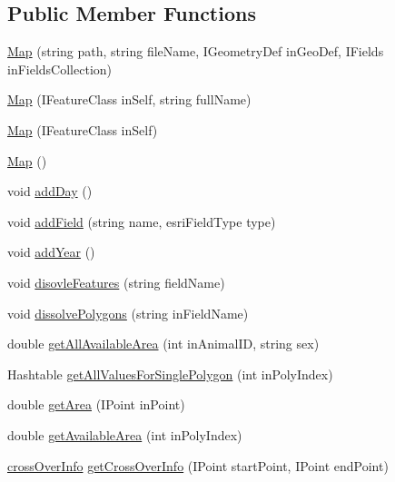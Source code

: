 \subsection*{Public Member Functions}
\begin{DoxyCompactItemize}
\item 
\hyperlink{class_s_e_a_r_c_h_1_1_map_a7ecbb3dd1eac1ee71904194f9ca07d9b}{Map} (string path, string file\-Name, I\-Geometry\-Def in\-Geo\-Def, I\-Fields in\-Fields\-Collection)
\item 
\hyperlink{class_s_e_a_r_c_h_1_1_map_a953088c1888b52aeb6e5e3ac07c727d5}{Map} (I\-Feature\-Class in\-Self, string full\-Name)
\item 
\hyperlink{class_s_e_a_r_c_h_1_1_map_af383f58d5e3f9d5c8d7cafc925c8c844}{Map} (I\-Feature\-Class in\-Self)
\item 
\hyperlink{class_s_e_a_r_c_h_1_1_map_a65bef4cc1272ada017b863831191c5e4}{Map} ()
\item 
void \hyperlink{class_s_e_a_r_c_h_1_1_map_a1b2e35d6d5df11469b120c86765d879a}{add\-Day} ()
\item 
void \hyperlink{class_s_e_a_r_c_h_1_1_map_aff5b1e936b7d53be0762ea3d65e5f3f9}{add\-Field} (string name, esri\-Field\-Type type)
\item 
void \hyperlink{class_s_e_a_r_c_h_1_1_map_ad29cd67a27cf5f0ba2957b1c043aea91}{add\-Year} ()
\item 
void \hyperlink{class_s_e_a_r_c_h_1_1_map_a6cfbea6bd3ad958c2e2156c7dc4acc31}{disovle\-Features} (string field\-Name)
\item 
void \hyperlink{class_s_e_a_r_c_h_1_1_map_a59ac519a37e976ad25c39a22fc9ead0f}{dissolve\-Polygons} (string in\-Field\-Name)
\item 
double \hyperlink{class_s_e_a_r_c_h_1_1_map_aeaea5c290cf0e3636e7357d66f54f879}{get\-All\-Available\-Area} (int in\-Animal\-I\-D, string sex)
\item 
Hashtable \hyperlink{class_s_e_a_r_c_h_1_1_map_a4e0fd4f6685b3e2780a04906da471d4b}{get\-All\-Values\-For\-Single\-Polygon} (int in\-Poly\-Index)
\item 
double \hyperlink{class_s_e_a_r_c_h_1_1_map_a242454b3ef52b6e4bb24738379b932e6}{get\-Area} (I\-Point in\-Point)
\item 
double \hyperlink{class_s_e_a_r_c_h_1_1_map_a50856220fecdac4c30dcbb0f65a28ba6}{get\-Available\-Area} (int in\-Poly\-Index)
\item 
\hyperlink{class_s_e_a_r_c_h_1_1cross_over_info}{cross\-Over\-Info} \hyperlink{class_s_e_a_r_c_h_1_1_map_ae0a445111db096d6b6bb09b64cdbbbe4}{get\-Cross\-Over\-Info} (I\-Point start\-Point, I\-Point end\-Point)

\end{DoxyCompactItemize}
